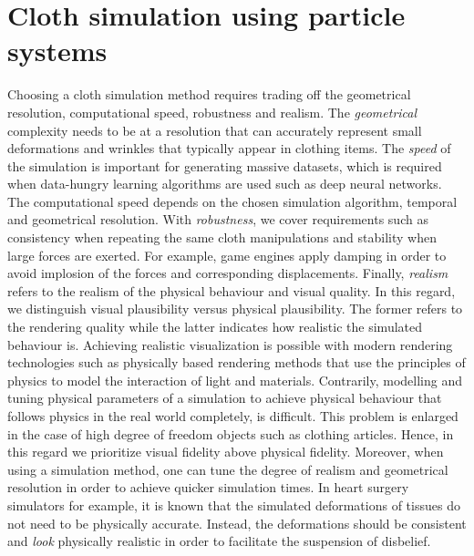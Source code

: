 \documentclass[\home/main.tex]{subfiles}
\begin{document}

\section{Cloth simulation using particle systems}



Choosing a cloth simulation method requires trading off the geometrical resolution, computational speed, robustness and realism.
The \emph{geometrical} complexity needs to be at a resolution that can accurately represent small deformations and wrinkles that typically appear in clothing items.
The \emph{speed} of the simulation is important for generating massive datasets, which is required when data-hungry learning algorithms are used such as deep neural networks. The computational speed depends on the chosen simulation algorithm, temporal and geometrical resolution.
With \emph{robustness}, we cover requirements such as consistency when repeating the same cloth manipulations and stability when large forces are exerted. For example, game engines apply damping in order to avoid implosion of the forces and corresponding displacements.
Finally, \emph{realism} refers to the realism of the physical behaviour and visual quality. In this regard, we distinguish visual plausibility versus physical plausibility. The former refers to the rendering quality while the latter indicates how realistic the simulated behaviour is. Achieving realistic visualization is possible with modern rendering technologies such as physically based rendering methods that use the principles of physics to model the interaction of light and materials. Contrarily, modelling and tuning physical parameters of a simulation to achieve physical behaviour that follows physics in the real world completely, is difficult. This problem is enlarged in the case of high degree of freedom objects such as clothing articles. Hence, in this regard we prioritize visual fidelity above physical fidelity. Moreover, when using a simulation method, one can tune the degree of realism and geometrical resolution in order to achieve quicker simulation times. In heart surgery simulators for example, it is known that the simulated deformations of tissues do not need to be physically accurate. Instead, the deformations should be consistent and \emph{look} physically realistic \autocite{BroNielsen1998} in order to facilitate the suspension of disbelief.
\end{document}
